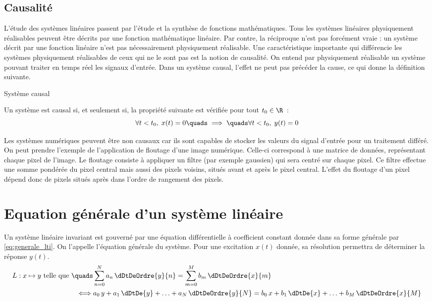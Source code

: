 \subsection{Causalité}
L'étude des systèmes linéaires passent par l'étude et la
synthèse de fonctions mathématiques. Tous les systèmes
linéaires physiquement réalisables peuvent être décrits par
une fonction mathématique linéaire. Par contre, la réciproque
n'est pas forcément vraie : un système décrit par une fonction
linéaire n'est pas nécessairement physiquement réalisable. Une
caractéristique importante qui différencie les systèmes
physiquement réalisables de ceux qui ne le sont pas est la
notion de causalité. On entend par physiquement réalisable un
système pouvant traiter en temps réel les signaux d'entrée.
Dans un système causal, l'effet ne peut pas précéder la cause,
ce qui donne la définition suivante.
\begin{definition}{Système causal}
  \label{def:causal}
  
  Un système est causal si, et seulement si, la propriété suivante est vérifiée pour tout $t_0 \in\R$~:
  \begin{equation}
    \label{eq:def_causal}
    \forall t<t_{0} ,\;  x(t) = 0 \quads\implies\quads \forall t<t_{0},\; y(t) = 0
  \end{equation}   
\end{definition}

Les systèmes numériques peuvent être non causaux car ils sont
capables de stocker les valeurs du signal d'entrée pour un
traitement différé. On peut prendre l'exemple de l'application
de floutage d'une image numérique. Celle-ci correspond à une
matrice de données, représentant chaque pixel de l'image. Le
floutage consiste à appliquer un filtre (par exemple gaussien)
qui sera centré sur chaque pixel. Ce filtre effectue une somme
pondérée du pixel central mais aussi des pixels voisins,
situés avant et après le pixel central. L'effet du floutage
d'un pixel dépend donc de pixels situés après dans l'ordre de
rangement des pixels.



\section{Equation générale d'un système linéaire}
Un système linéaire invariant est gouverné par une équation
différentielle à coefficient constant donnée dans sa forme
générale par \ref{eq:generale_lti}. On l'appelle l'équation
générale du système. Pour une excitation $x(t)$ donnée, sa
résolution permettra de déterminer la réponse $y(t)$.	
\begin{eqnarray}\label{eq:generale_lti}
  L : x \mapsto y \text{ telle que }\quads &\sum_{n=0}^N{a_{n}\,\dDtDeOrdre{y}{n}} = \sum_{m=0}^M b_{m}\, \dDtDeOrdre{x}{m}\\\nonumber
  \iff & a_0\,y + a_1\,\dDtDe{y} +\ldots + a_{N}\,\dDtDeOrdre{y}{N} = b_0\,x + b_1\,\dDtDe{x} +\ldots + b_{M}\,\dDtDeOrdre{x}{M} 
\end{eqnarray}


